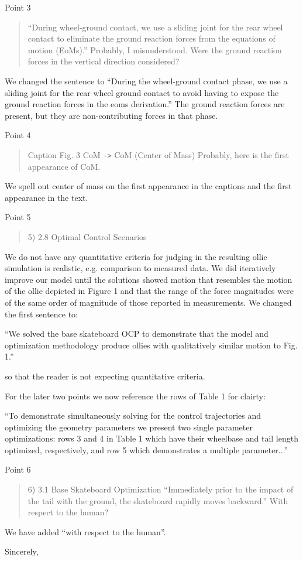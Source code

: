 \documentclass{letter}
\begin{document}
\begin{letter}{}
Point 3

\begin{quote}
    “During wheel-ground contact, we use a sliding joint for the rear wheel contact to eliminate the ground reaction forces from the equations of motion (EoMs).” Probably, I misunderstood. Were the ground reaction forces in the vertical direction considered?
\end{quote}

We changed the sentence to ``During the wheel-ground contact phase, we use a sliding joint for the rear wheel ground contact to avoid having to expose the ground reaction forces in the \glspl{eom} derivation.'' The ground reaction forces are present, but they are non-contributing forces in that phase.

Point 4

\begin{quote}
    Caption Fig. 3 CoM \verb|->| CoM (Center of Mass) Probably, here is the first appearance of CoM.
\end{quote}

We spell out center of mass on the first appearance in the captions and the first appearance in the text.

Point 5

\begin{quote}
    5) 2.8 Optimal Control Scenarios
\end{quote}

We do not have any quantitative criteria for judging in the resulting ollie simulation is realistic, e.g. comparison to measured data. We did iteratively improve our model until the solutions showed motion that resembles the motion of the ollie depicted in Figure 1 and that the range of the force magnitudes were of the same order of magnitude of those reported in measurements. We changed the first sentence to:

``We solved the base skateboard OCP to demonstrate that the model and optimization methodology produce ollies with qualitatively similar motion to Fig. 1.''

so that the reader is not expecting quantitative criteria.

For the later two points we now reference the rows of Table 1 for clairty:

``To demonstrate simultaneously solving for the control trajectories and optimizing the geometry parameters we present two single parameter optimizations: rows 3 and 4 in Table 1 which have their wheelbase and tail length optimized, respectively, and row 5 which demonstrates a multiple parameter...''

Point 6

\begin{quote}
    6) 3.1 Base Skateboard Optimization ``Immediately prior to the impact of the tail with the ground, the skateboard rapidly moves backward.'' With respect to the human?
\end{quote}

We have added ``with respect to the human''.

\closing{Sincerely,}

\end{letter}
\end{document}
